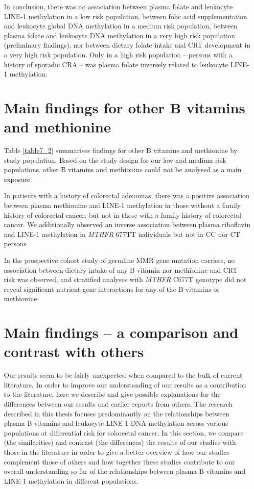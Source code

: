 \noindent In conclusion, there was no association between plasma folate and leukocyte LINE-1 methylation in a low risk population, between folic acid supplementation and leukocyte global DNA methylation in a medium risk population, between plasma folate and leukocyte DNA methylation in a very high risk population (preliminary findings), nor between dietary folate intake and CRT development in a very high risk population. Only in a high risk population -- persons with a history of sporadic CRA -- was plasma folate inversely related to leukocyte LINE-1 methylation.

\section{Main findings for other B vitamins and methionine} %
\noindent Table \ref{table7_2} summarises findings for other B vitamins and methionine by study population. Based on the study design for our low and medium risk populations, other B vitamins and methionine could not be analysed as a main exposure.

\noindent In patients with a history of colorectal adenomas, there was a positive association between plasma methionine and LINE-1 methylation in those without a family history of colorectal cancer, but not in those with a family history of colorectal cancer. We additionally observed an inverse association between plasma riboflavin and LINE-1 methylation in \emph{MTHFR} 677TT individuals but not in CC nor CT persons.

\noindent In the prospective cohort study of germline MMR gene mutation carriers, no association between dietary intake of any B vitamin nor methionine and CRT risk was observed, and stratified analyses with \emph{MTHFR} C677T genotype did not reveal significant nutrient-gene interactions for any of the B vitamins or methionine.

\section{Main findings -- a comparison and contrast with others} %
\noindent Our results seem to be fairly unexpected when compared to the bulk of current literature. In order to improve our understanding of our results as a contribution to the literature, here we describe and give possible explanations for the differences between our results and earlier reports from others. The research described in this thesis focuses predominantly on the relationships between plasma B vitamins and leukocyte LINE-1 DNA methylation across various populations at differential risk for colorectal cancer. In this section, we compare (the similarities) and contrast (the differences) the results of our studies with those in the literature in order to give a better overview of how our studies complement those of others and how together these studies contribute to our overall understanding so far of the relationships between plasma B vitamins and LINE-1 methylation in different populations.

